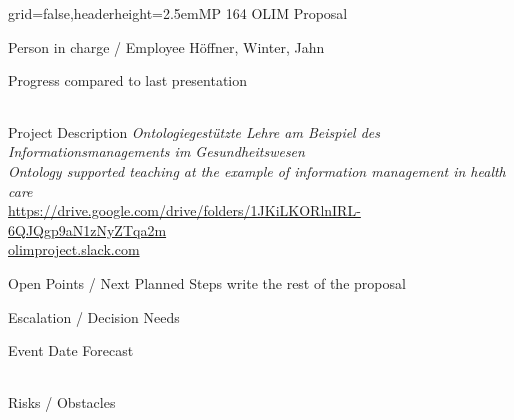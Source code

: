 \documentclass[english]{kiesgrube}
\begin{document}
\begin{poster}{grid=false,headerheight=2.5em}{}{MP 164 OLIM Proposal}{}{}
\begin{posterbox}[name=person,column=0,row=0]{Person in charge / Employee}
Höffner, Winter, Jahn
\end{posterbox}
\begin{posterbox}[name=progress,below=person]{Progress compared to last presentation}
\begin{tabulary}{\textwidth}{lL}
\end{tabulary}
\end{posterbox}
\begin{posterbox}[name=description,column=1,row=0]{Project Description}
\emph{Ontologiegestützte Lehre am Beispiel des Informationsmanagements im Gesundheitswesen}\\
\emph{Ontology supported teaching at the example of information management in health care}\\
\url{https://drive.google.com/drive/folders/1JKiLKORlnIRL-6QJQgp9aN1zNyZTqa2m}\\
\url{olimproject.slack.com}
\end{posterbox}
\begin{posterbox}[name=open,column=1,below=description]{Open Points / Next Planned Steps}
write the rest of the proposal
\end{posterbox}
\begin{posterbox}[name=escalation,column=1,below=open]{Escalation / Decision Needs}
\end{posterbox}
\begin{posterbox}[name=event,below=progress,]{Event Date Forecast}
\begin{tabulary}{\textwidth}{lL}
\end{tabulary}
\end{posterbox}
\begin{posterbox}[name=event,below=event]{Risks / Obstacles}
\end{posterbox}
\footer{}
\end{poster}
\end{document}
